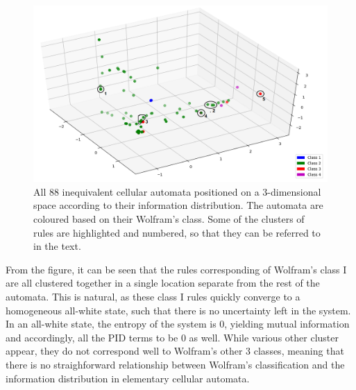 \documentclass[12pt]{article}
\begin{document}
\begin{figure} [!h]
\begin{center}
\includegraphics[width=.9\textwidth]{eca-pid-characterization}
\caption{All 88 inequivalent cellular automata positioned on a 3-dimensional space according to their information distribution. The automata are coloured based on their Wolfram's class. Some of the clusters of rules are highlighted and numbered, so that they can be referred to in the text.}
\label{fig:eca-pid-char}
\end{center}
\end{figure}

From the figure, it can be seen that the rules corresponding of Wolfram's class I are all clustered together in a single location separate from the rest of the automata. This is natural, as these class I rules quickly converge to a homogeneous all-white state, such that there is no uncertainty left in the system. In an all-white state, the entropy of the system is 0, yielding mutual information and accordingly, all the PID terms to be 0 as well. While various other cluster appear, they do not correspond well to Wolfram's other 3 classes, meaning that there is no straighforward relationship between Wolfram's classification and the information distribution in elementary cellular automata. 
\end{document}
